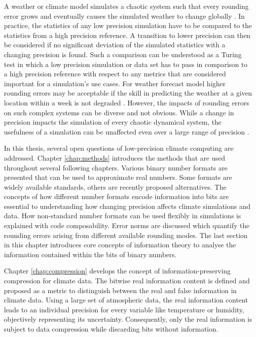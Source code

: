 A weather or climate model simulates a chaotic system such that every rounding error grows and eventually causes the
simulated weather to change globally \citep{Lorenz1963,Palmer2014b}. In practice, the statistics of any low precision
simulation have to be compared to the statistics from a high precision reference. A transition to lower precision
can then be considered if no significant deviation of the simulated statistics with a changing precision is found. Such a comparison
can be understood as a Turing test \citep{Turing1950, Baker2019} in which a low precision simulation or data set has to pass in
comparison to a high precision reference with respect to any metrics that are considered important for a simulation's use cases.
For weather forecast model higher rounding errors may be acceptable if the skill in predicting the weather at a given location within
a week is not degraded \citep{Duben2014}. However, the impacts of rounding errors on such complex systems can be diverse
and not obvious. While a change in precision impacts the simulation of every chaotic dynamical system, the usefulness of a simulation
can be unaffected even over a large range of precision \citep{Palmer2015}.

In this thesis, several open questions of low-precision climate computing are addressed. Chapter \ref{chap:methods} introduces
the methods that are used throughout several following chapters. Various binary number formats are presented that can be used
to approximate real numbers. Some formats are widely available standards, others are recently proposed alternatives.
The concepts of how different number formats encode information into bits are essential to understanding how changing
precision affects climate simulations and data. How non-standard number formats can be used flexibly in simulations
is explained with code composability. Error norms are discussed which quantify the rounding errors arising from
different available rounding modes. The last section in this chapter introduces core concepts of information theory to analyse the
information contained within the bits of binary numbers.

Chapter \ref{chap:compression} develops the concept of information-preserving compression for climate data. The bitwise real
information content is defined and proposed as a metric to distinguish between the real and false information in climate data.
Using a large set of atmospheric data, the real information content leads to an individual precision for every variable like
temperature or humidity, objectively representing its uncertainty. Consequently, only the real information is subject
to data compression while discarding bits without information.

